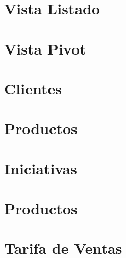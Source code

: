 \documentclass[letterpaper,10pt,spanish]{sphinxmanual}
\begin{document}
\section{Vista Listado}
\label{\detokenize{funcional/basico/vista-listado:vista-listado}}\label{\detokenize{funcional/basico/vista-listado:id1}}\label{\detokenize{funcional/basico/vista-listado::doc}}

\section{Vista Pivot}
\label{\detokenize{funcional/basico/vista-pivot:vista-pivot}}\label{\detokenize{funcional/basico/vista-pivot:id1}}\label{\detokenize{funcional/basico/vista-pivot::doc}}


\section{Clientes}
\label{\detokenize{funcional/datos-maestros/clientes:clientes}}\label{\detokenize{funcional/datos-maestros/clientes:id1}}\label{\detokenize{funcional/datos-maestros/clientes::doc}}

\section{Productos}
\label{\detokenize{funcional/datos-maestros/productos:productos}}\label{\detokenize{funcional/datos-maestros/productos:id1}}\label{\detokenize{funcional/datos-maestros/productos::doc}}


\section{Iniciativas}
\label{\detokenize{funcional/crm/iniciativas:iniciativas}}\label{\detokenize{funcional/crm/iniciativas:id1}}\label{\detokenize{funcional/crm/iniciativas::doc}}


\section{Productos}
\label{\detokenize{funcional/ventas/productos:productos}}\label{\detokenize{funcional/ventas/productos:prodcutos}}\label{\detokenize{funcional/ventas/productos::doc}}

\section{Tarifa de Ventas}
\label{\detokenize{funcional/ventas/tarifas-de-ventas:tarifa-de-ventas}}\label{\detokenize{funcional/ventas/tarifas-de-ventas:id1}}\label{\detokenize{funcional/ventas/tarifas-de-ventas::doc}}
\end{document}
